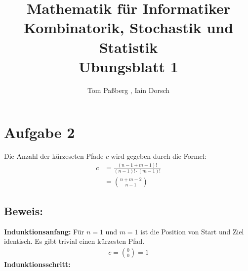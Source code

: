 \documentclass[a4paper]{scrartcl}
\title{Mathematik für Informatiker \\ Kombinatorik, Stochastik und Statistik \\ Ubungsblatt 1}
\author{Tom Paßberg , Iain Dorsch}
\date{}
\begin{document}
\maketitle

\newpage

\section*{Aufgabe 2}
Die Anzahl der kürzeseten Pfade $c$ wird gegeben durch die Formel:
\begin{align*}
    c &= \frac{(n - 1 + m  - 1)!}{(n-1)! \cdot (m-1)!} \\[12px]
    &= \binom{n + m - 2}{n - 1}
\end{align*}

\subsection*{Beweis:}
\textbf{Indunktionsanfang:}
Für $n = 1$ und $m = 1$ ist die Position von Start und Ziel identisch. 
Es gibt trivial einen kürzesten Pfad. \\
\begin{align*}
    c = \binom{0}{0} = 1
\end{align*}
\textbf{Indunktionsschritt:}
\end{document}
